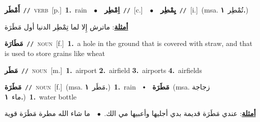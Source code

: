 \documentclass[10pt,a4paper,twoside]{article} %
\begin{document}
\begin{multicols}{2}
{\setlength\topsep{0pt}\textbf{\foreignlanguage{arabic}{أَمْطَر}}\ {\color{gray}\texttt{//}\color{black}}\ \textsc{verb}\ [p.]\ \textbf{1.}~rain\ \ $\bullet$\ \ \setlength\topsep{0pt}\textbf{\foreignlanguage{arabic}{اِمْطِر}}\ {\color{gray}\texttt{//}\color{black}}\ [c.]\ \ $\bullet$\ \ \setlength\topsep{0pt}\textbf{\foreignlanguage{arabic}{يِمْطِر}}\ {\color{gray}\texttt{//}\color{black}}\ [i.]\ \color{gray}(msa. \foreignlanguage{arabic}{تُمْطِر}~\foreignlanguage{arabic}{\textbf{١.}})\color{black}\  \begin{flushright}\color{gray}\foreignlanguage{arabic}{\textbf{\underline{\foreignlanguage{arabic}{أمثلة}}}: ماترش إِلا لما تِمْطِر الدنيا أول مَطَرَة}\end{flushright}\color{black}} \vspace{2mm}

{\setlength\topsep{0pt}\textbf{\foreignlanguage{arabic}{مَطَارَة}}\ {\color{gray}\texttt{//}\color{black}}\ \textsc{noun}\ [f.]\ \textbf{1.}~a hole in the ground that is covered with straw, and that is used to store grains like wheat\ } \vspace{2mm}

{\setlength\topsep{0pt}\textbf{\foreignlanguage{arabic}{مَطَر}}\ {\color{gray}\texttt{//}\color{black}}\ \textsc{noun}\ [m.]\ \textbf{1.}~airport  \textbf{2.}~airfield  \textbf{3.}~airports  \textbf{4.}~airfields\ } \vspace{2mm}

{\setlength\topsep{0pt}\textbf{\foreignlanguage{arabic}{مَطَرَة}}\ {\color{gray}\texttt{//}\color{black}}\ \textsc{noun}\ [f.]\ \color{gray}(msa. \foreignlanguage{arabic}{مَطَر}~\foreignlanguage{arabic}{\textbf{١.}})\color{black}\ \textbf{1.}~rain\ \ $\smblkdiamond$\ \ \setlength\topsep{0pt}\textbf{\foreignlanguage{arabic}{مَطَرَة}}\ \color{gray}(msa. \foreignlanguage{arabic}{زجاجة ماء}~\foreignlanguage{arabic}{\textbf{١.}})\color{black}\ \textbf{1.}~water bottle\  \begin{flushright}\color{gray}\foreignlanguage{arabic}{\textbf{\underline{\foreignlanguage{arabic}{أمثلة}}}: عندي مَطَرَة قديمة بدي أجليها وأعبيها مي الك.\ $\bullet$\ \  ما شاء الله مطرة مَطَرَة قوية}\end{flushright}\color{black}} \vspace{2mm}


\end{multicols}
\end{document}
